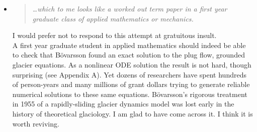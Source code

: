 \documentclass[11pt,reqno]{amsart}
\renewcommand{\dh}{\fontencoding{T1}\selectfont{\symbol{240}}}
\newcommand{\bod}{B\"o\dh varsson\xspace}
\newcommand{\reply}[2]{
\medskip\medskip
\item  \begin{quote}
\emph{#1}
\end{quote}

\medskip
\noindent #2}
\begin{document}
\begin{itemize}
\reply{\dots which to me looks like a worked out term paper in a first year graduate class of applied mathematics or mechanics.}
{I would prefer not to respond to this attempt at gratuitous insult. \medskip \\
A first year graduate student in applied mathematics should indeed be able to check that \bod found an exact solution to the plug flow, grounded glacier equations.  As a nonlinear ODE solution the result is not hard, though surprising (see Appendix A).  Yet dozens of researchers have spent hundreds of person-years and many millions of grant dollars trying to generate reliable numerical solutions to these same equations.  \bod's rigorous treatment in 1955 of a rapidly-sliding glacier dynamics model was lost early in the history of theoretical glaciology.  I am glad to have come across it.  I think it is worth reviving.}
\end{itemize}
\end{document}
